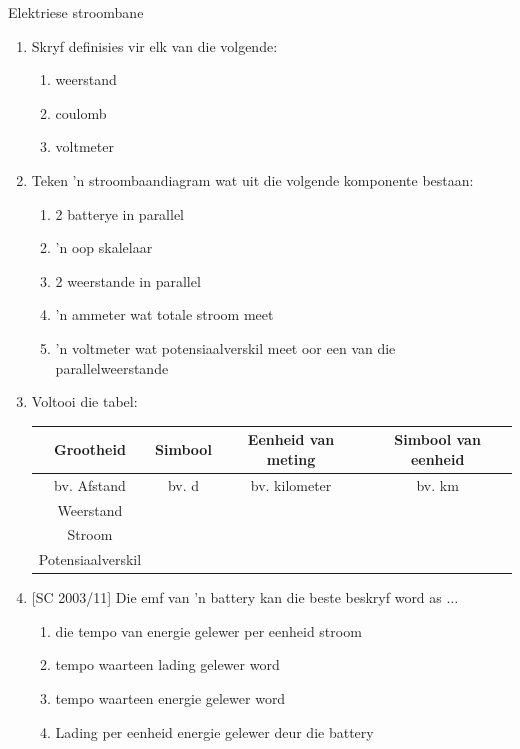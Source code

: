 \begin{eocexercises}{Elektriese stroombane}

\begin{enumerate}[noitemsep, label=\textbf{\arabic*}. ] 
\item{ Skryf definisies vir elk van die volgende:
  \begin{enumerate}[noitemsep, label=\textbf{\alph*}. ] 
  \item weerstand
  \item coulomb
  \item voltmeter
  \end{enumerate}}

\item{ Teken  'n stroombaandiagram wat uit die volgende komponente bestaan:
  \begin{enumerate}[noitemsep, label=\textbf{\alph*}. ] 
  \item 2 batterye in parallel
  \item  'n oop skalelaar
  \item 2 weerstande in parallel
  \item  'n ammeter wat totale stroom meet
  \item  'n voltmeter wat potensiaalverskil meet oor een van die
parallelweerstande
  \end{enumerate}}

\item{ Voltooi die tabel: \\

\begin{tabular}{ | c | c | c | c| } \hline 
\textbf{Grootheid} & \textbf{Simbool} & \textbf{Eenheid van meting} &
\textbf{Simbool van eenheid} \\ \hline \hline 
bv. Afstand & bv. d & bv. kilometer & bv. km \\ \hline 
Weerstand &   &   &  \\ \hline
Stroom  &   &   &  \\ \hline
Potensiaalverskil  &   &   &  \\ \hline
\hline
\end{tabular}
}

\item{[SC 2003/11] Die emf van  'n battery kan die beste beskryf word as $\dots$
\begin{enumerate}[noitemsep, label=\textbf{\alph*}. ] 
\item{die tempo van energie gelewer per eenheid stroom}
\item{tempo waarteen lading gelewer word}
\item{tempo waarteen energie gelewer word}
\item{Lading per eenheid energie gelewer deur die battery}
\end{enumerate}}


\end{enumerate}
\end{eocexercises}
